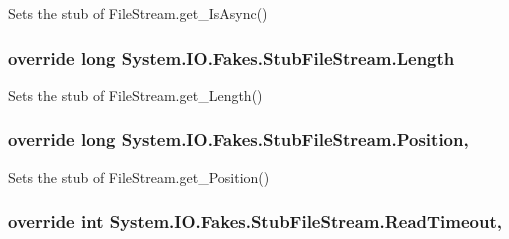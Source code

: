 Sets the stub of File\-Stream.\-get\-\_\-\-Is\-Async()

\hypertarget{class_system_1_1_i_o_1_1_fakes_1_1_stub_file_stream_ab0dd1dce45a156589607f01399222d7a}{
\subsubsection[{Length}]{\setlength{\rightskip}{0pt plus 5cm}override long System.\-I\-O.\-Fakes.\-Stub\-File\-Stream.\-Length\hspace{0.3cm}{\ttfamily [get]}}}\label{class_system_1_1_i_o_1_1_fakes_1_1_stub_file_stream_ab0dd1dce45a156589607f01399222d7a}


Sets the stub of File\-Stream.\-get\-\_\-\-Length()

\hypertarget{class_system_1_1_i_o_1_1_fakes_1_1_stub_file_stream_a327db6cff7ff7dcdab3eb56c43fd0b49}{
\subsubsection[{Position}]{\setlength{\rightskip}{0pt plus 5cm}override long System.\-I\-O.\-Fakes.\-Stub\-File\-Stream.\-Position\hspace{0.3cm}{\ttfamily [get]}, {\ttfamily [set]}}}\label{class_system_1_1_i_o_1_1_fakes_1_1_stub_file_stream_a327db6cff7ff7dcdab3eb56c43fd0b49}


Sets the stub of File\-Stream.\-get\-\_\-\-Position()

\hypertarget{class_system_1_1_i_o_1_1_fakes_1_1_stub_file_stream_a2ddebba00acbdc7dcc379db1d4ba7b93}{
\subsubsection[{Read\-Timeout}]{\setlength{\rightskip}{0pt plus 5cm}override int System.\-I\-O.\-Fakes.\-Stub\-File\-Stream.\-Read\-Timeout\hspace{0.3cm}{\ttfamily [get]}, {\ttfamily [set]}}}\label{class_system_1_1_i_o_1_1_fakes_1_1_stub_file_stream_a2ddebba00acbdc7dcc379db1d4ba7b93}


